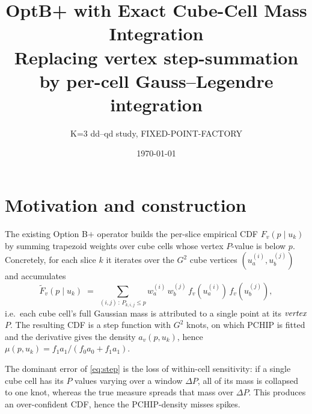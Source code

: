 \documentclass[10pt]{article}
\title{OptB+ with Exact Cube-Cell Mass Integration\\
\large{Replacing vertex step-summation by per-cell Gauss--Legendre integration}}
\author{K=3 dd--qd study, FIXED-POINT-FACTORY}
\date{\today}
\begin{document}
\maketitle

\section{Motivation and construction}

The existing Option B$+$ operator builds the per-slice empirical CDF
$F_v(p\mid u_k)$ by summing trapezoid weights over cube cells whose vertex
$P$-value is below $p$. Concretely, for each slice $k$ it iterates over
the $G^2$ cube vertices $(u_a^{(i)},u_b^{(j)})$ and accumulates
\begin{equation}\label{eq:step}
  \widetilde F_v(p\mid u_k)
  \;=\; \sum_{(i,j)\,:\,P_{k,i,j}\le p}
                w_a^{(i)}\,w_b^{(j)}\,f_v(u_a^{(i)})\,f_v(u_b^{(j)}),
\end{equation}
i.e.\ each cube cell's full Gaussian mass is attributed to a single point at
its $\emph{vertex}$ $P$. The resulting CDF is a step function with $G^2$
knots, on which PCHIP is fitted and the derivative gives the density
$a_v(p,u_k)$, hence
$\mu(p,u_k)=f_1 a_1/(f_0 a_0+f_1 a_1)$.

The dominant error of \eqref{eq:step} is the loss of within-cell sensitivity:
if a single cube cell has its $P$ values varying over a window $\Delta P$,
all of its mass is collapsed to one knot, whereas the true measure spreads
that mass over $\Delta P$. This produces an over-confident CDF, hence the
PCHIP-density misses spikes.
\end{document}
